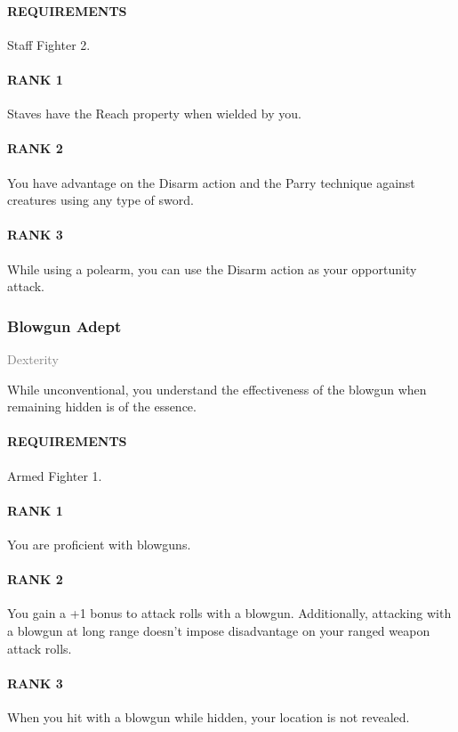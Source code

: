 \paragraph{REQUIREMENTS} Staff Fighter 2.
\paragraph{RANK 1} Staves have the Reach property when wielded by you.
\paragraph{RANK 2} You have advantage on the Disarm action and the Parry technique against creatures using any type of sword.
\paragraph{RANK 3} While using a polearm, you can use the Disarm action as your opportunity attack.

\subsubsection{Blowgun Adept} \label{tal::blowgunadept}
\small{\textcolor{gray}{Dexterity}}

\normalsize
While unconventional, you understand the effectiveness of the blowgun when remaining hidden is of the essence.
\paragraph{REQUIREMENTS} Armed Fighter 1.
\paragraph{RANK 1} You are proficient with blowguns.
\paragraph{RANK 2} You gain a +1 bonus to attack rolls with a blowgun.
Additionally, attacking with a blowgun at long range doesn't impose disadvantage on your ranged weapon attack rolls.
\paragraph{RANK 3} When you hit with a blowgun while hidden, your location is not revealed.

